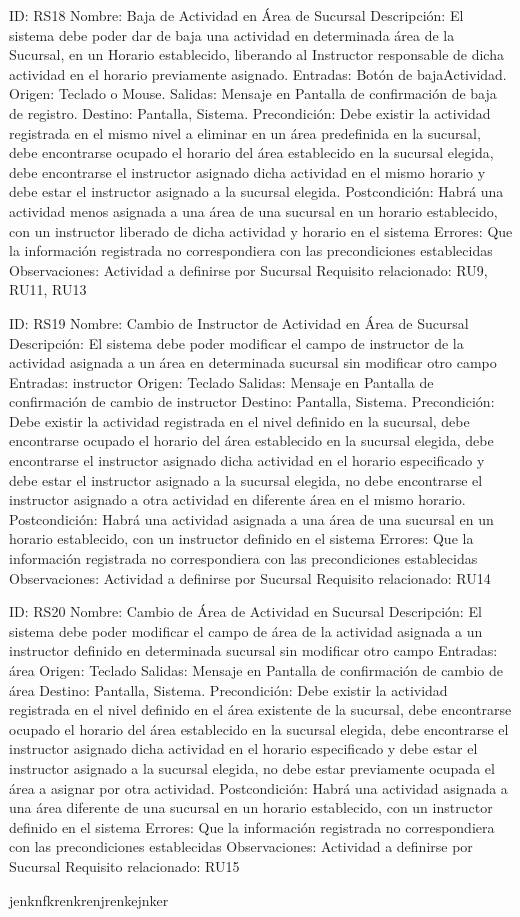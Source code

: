 ID: RS18
Nombre: Baja de Actividad en Área de Sucursal
Descripción: El sistema debe poder dar de baja una actividad en determinada área de la Sucursal, en un Horario establecido, liberando al Instructor responsable de dicha actividad en el horario previamente asignado.
Entradas: Botón de bajaActividad.
Origen: Teclado o Mouse.
Salidas: Mensaje en Pantalla de confirmación de baja de registro. 
Destino: Pantalla, Sistema.
Precondición: Debe existir la actividad registrada en el mismo nivel a eliminar en un área predefinida en la sucursal, debe encontrarse ocupado el horario del área establecido en la sucursal elegida, debe encontrarse el instructor asignado dicha actividad en el mismo horario y debe estar el instructor asignado a la sucursal elegida.
Postcondición: Habrá una actividad menos asignada a una área de una sucursal en un horario establecido, con un instructor liberado de dicha actividad y horario en el sistema
Errores: Que la información registrada no correspondiera con las precondiciones establecidas
Observaciones: Actividad a definirse por Sucursal
Requisito relacionado: RU9, RU11, RU13

ID: RS19
Nombre: Cambio de Instructor de Actividad en Área de Sucursal
Descripción: El sistema debe poder modificar el campo de instructor de la actividad asignada a un área en determinada sucursal sin modificar otro campo
Entradas: instructor
Origen: Teclado
Salidas: Mensaje en Pantalla de confirmación de cambio de instructor
Destino: Pantalla, Sistema.
Precondición: Debe existir la actividad registrada en el nivel definido en la sucursal, debe encontrarse ocupado el horario del área establecido en la sucursal elegida, debe encontrarse el instructor asignado dicha actividad en el horario especificado y debe estar el instructor asignado a la sucursal elegida, no debe encontrarse el instructor asignado a otra actividad en diferente área en el mismo horario.
Postcondición: Habrá una actividad asignada a una área de una sucursal en un horario establecido, con un instructor definido en el sistema
Errores: Que la información registrada no correspondiera con las precondiciones establecidas
Observaciones: Actividad a definirse por Sucursal
Requisito relacionado: RU14
 
ID: RS20
Nombre: Cambio de Área de Actividad en Sucursal
Descripción: El sistema debe poder modificar el campo de área de la actividad asignada a un instructor definido en determinada sucursal sin modificar otro campo
Entradas: área
Origen: Teclado
Salidas: Mensaje en Pantalla de confirmación de cambio de área
Destino: Pantalla, Sistema.
Precondición: Debe existir la actividad registrada en el nivel definido en el área existente de la sucursal, debe encontrarse ocupado el horario del área establecido en la sucursal elegida, debe encontrarse el instructor asignado dicha actividad en el horario especificado y debe estar el instructor asignado a la sucursal elegida, no debe estar previamente ocupada el área a asignar por otra actividad.
Postcondición: Habrá una actividad asignada a una área diferente de una sucursal en un horario establecido, con un instructor definido en el sistema
Errores: Que la información registrada no correspondiera con las precondiciones establecidas
Observaciones: Actividad a definirse por Sucursal
Requisito relacionado: RU15

jenknfkrenkrenjrenkejnker
